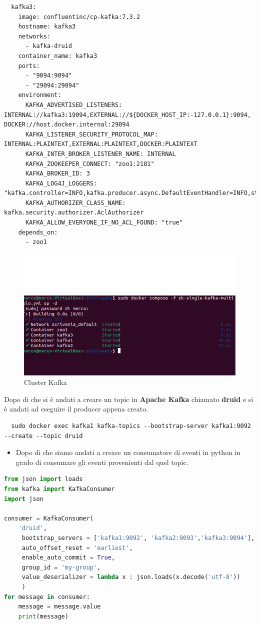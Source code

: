 \documentclass{article}
\begin{document}
\begin{lstlisting}
  kafka3:
    image: confluentinc/cp-kafka:7.3.2
    hostname: kafka3
    networks: 
      - kafka-druid
    container_name: kafka3
    ports:
      - "9094:9094"
      - "29094:29094"
    environment:
      KAFKA_ADVERTISED_LISTENERS: INTERNAL://kafka3:19094,EXTERNAL://${DOCKER_HOST_IP:-127.0.0.1}:9094, DOCKER://host.docker.internal:29094
      KAFKA_LISTENER_SECURITY_PROTOCOL_MAP: INTERNAL:PLAINTEXT,EXTERNAL:PLAINTEXT,DOCKER:PLAINTEXT
      KAFKA_INTER_BROKER_LISTENER_NAME: INTERNAL
      KAFKA_ZOOKEEPER_CONNECT: "zoo1:2181"
      KAFKA_BROKER_ID: 3
      KAFKA_LOG4J_LOGGERS: "kafka.controller=INFO,kafka.producer.async.DefaultEventHandler=INFO,state.change.logger=INFO"
      KAFKA_AUTHORIZER_CLASS_NAME: kafka.security.authorizer.AclAuthorizer
      KAFKA_ALLOW_EVERYONE_IF_NO_ACL_FOUND: "true"
    depends_on:
      - zoo1

\end{lstlisting}
\begin{figure}[h]
    \centering
    \includegraphics[scale=0.5]{images/kluster_producer.png}
    \caption{Cluster Kafka}
    \label{fig:my_label}
\end{figure}
Dopo di che si è andati a creare un topic in \textbf{Apache Kafka} chiamato \textbf{druid} e si è andati ad eseguire il producer appena creato.
\begin{lstlisting}
  sudo docker exec kafka1 kafka-topics --bootstrap-server kafka1:9092 --create --topic druid
\end{lstlisting}
\pagebreak
\begin{itemize}
    \item Dopo di che siamo andati a creare un consumatore di eventi in python in grado di consumare gli eventi provenienti dal quel topic.
\end{itemize}
\begin{lstlisting}[language=Python]
from json import loads  
from kafka import KafkaConsumer  
import json

consumer = KafkaConsumer(  
    'druid',  
     bootstrap_servers = ['kafka1:9092', 'kafka2:9093','kafka3:9094'],  
     auto_offset_reset = 'earliest',  
     enable_auto_commit = True,  
     group_id = 'my-group',  
     value_deserializer = lambda x : json.loads(x.decode('utf-8'))  
     )  
for message in consumer:  
    message = message.value  
    print(message)      
\end{lstlisting}
\end{document}
